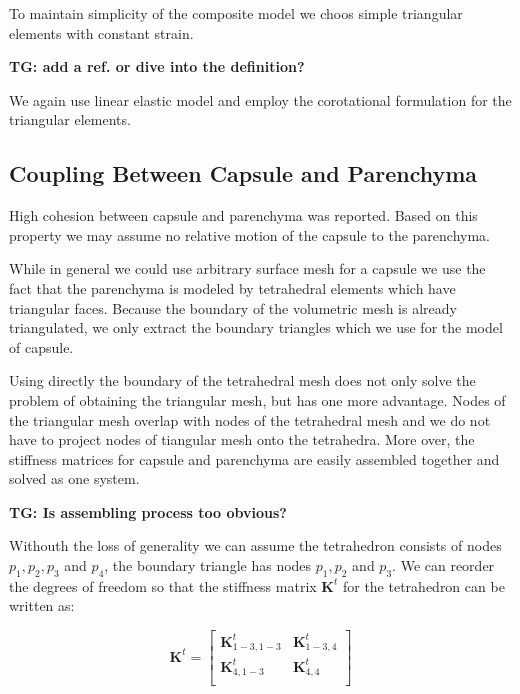 \documentclass{llncs}
\newcommand{\TG}[1]{{\color{blue}\textbf{TG: #1}}}
\newcommand{\Mat}[1]{\mathbf{#1}}
\begin{document}
To maintain simplicity of the composite model we choos simple triangular
elements with constant strain.

\TG{add a ref. or dive into the definition?}

We again use linear elastic model and employ the  corotational formulation
for the triangular elements.




\subsection{Coupling Between Capsule and Parenchyma} %

High cohesion between capsule and parenchyma was reported. Based on this
property we may assume no relative motion of the capsule to the parenchyma.

While in general we could use arbitrary surface mesh for a capsule we use
the fact that the parenchyma is modeled by tetrahedral elements which have
triangular faces. Because the boundary of the volumetric mesh is already
triangulated, we only extract the boundary triangles which we use for the
model of capsule.

Using directly the boundary of the tetrahedral mesh does not only solve the
problem of obtaining the triangular mesh, but has one more advantage. Nodes
of the triangular mesh overlap with nodes of the tetrahedral mesh and we do
not have to project nodes of tiangular mesh onto the tetrahedra. More over,
the stiffness matrices for capsule and parenchyma are easily assembled
together and solved as one system.

\TG{Is assembling process too obvious?}

Withouth the loss of generality we can assume the tetrahedron consists of
nodes $p_1, p_2, p_3$ and $p_4$, the boundary triangle has nodes $p_1, p_2$
and $p_3$. We can reorder the degrees of freedom so that the stiffness
matrix $\Mat{K}^t$ for the tetrahedron can be written as:

\begin{equation}
  \Mat{K}^t = \left[\begin{array}{c|c}
      \Mat{K}^t_{1-3,1-3} & \Mat{K}^t_{1-3,4} \\
      \hline
      \Mat{K}^t_{4,1-3} & \Mat{K}^t_{4,4} \\
  \end{array}\right]
\end{equation}
\end{document}
